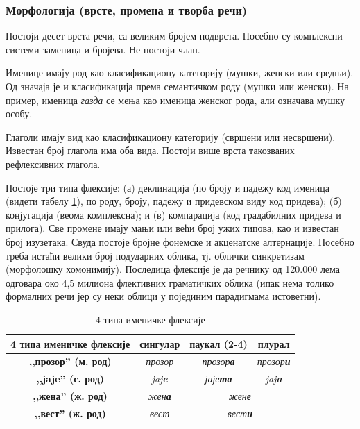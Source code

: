 \begin{multicols}{2}
\subsubsection {Морфологија (врсте, промена и творба речи)}
  
Постоји десет врста речи, са великим бројем подврста. Посебно су комплексни системи заменица и бројева. Не постоји члан. 

Именице имају род као класификациону категорију (мушки, женски или средњи). Од значаја је и класификација према семантичком роду (мушки или женски). На пример, именица \textit{газда} се мења као именица женског рода, али означава мушку особу. 

Глаголи имају вид као класификациону категорију (свршени или  несвршени). Известан број глагола има оба вида. Постоји више врста такозваних рефлексивних глагола. 

Постоје три типа флексије: (а) деклинација (по броју и падежу код именица (видети табелу \ref{imenicke_fleksije}), по роду, броју, падежу и придевском виду код придева); (б) конјугација (веома комплексна); и (в) компарација (код градабилних придева и прилога).  Све промене имају мањи или већи број ужих типова, као и известан број изузетака. Свуда постоје бројне фонемске и акценатске алтернације. Посебно треба истаћи велики број подударних облика, тј. облички синкретизам (морфолошку хомонимију). Последица флексије је да речнику од 120.000 лема одговара око 4,5 милиона флективних граматичких облика (ипак нема толико формалних речи јер су неки облици у појединим парадигмама истоветни). 

\begin{table}[ht]
\begin{center}
\begin{tabular}{|c|c|c|c|}
\hline
{\textbf{4 типа именичке флексије}} & {\textbf{сингулар}} & {\textbf{паукал (2-4)}} & {\textbf{плурал}} \\
\hline
{\textbf{,,прозор'' (м. род)}} & \textit{прозор} & \textit{прозор\textbf{а}} & \textit{прозор\textbf{и}} \\
\hline
{\textbf{,,jaje'' (с. род)}} & \textit{jaj\textbf{e}} & \textit{јаје\textbf{та}} & \textit{jaj\textbf{a}} \\
\hline
{\textbf{,,жена'' (ж. род)}} & \textit{жен\textbf{а}} & \multicolumn{2}{c|}{\textit{жен\textbf{е}}} \\
\hline
{\textbf{,,вест'' (ж. род)}} & \textit{вест} &  \multicolumn{2}{c|}{\textit{вест\textbf{и}}} \\
\hline
\end{tabular}
\end{center}
\caption{4 типа именичке флексије}
\label{imenicke_fleksije}
\end{table}



\end{multicols}
